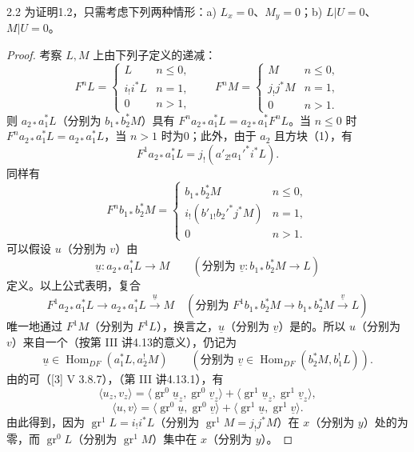\begin{SGAresult}{}{2.2}
为证明1.2，只需考虑下列两种情形：a) $L_x=0$、$M_y=0$；b) $L|U=0$、$M|U=0$。
\end{SGAresult}
\begin{proof}
考察 $L,M$ 上由下列子定义的递减：
\[
 F^nL=\begin{cases}L&n\leq0,\\ i_!i^*L&n=1,\\0&n>1,\end{cases}
 \qquad
 F^nM=\begin{cases}M&n\leq0,\\j_!j^*M&n=1,\\0&n>1.\end{cases}
\]
则 $a_{2*}a_1^*L$（分别为 $b_{1*}b_2^*M$）具有 $F^na_{2*}a_1^*L=a_{2*}a_1^*F^nL$。当 $n\leq0$ 时 $F^na_{2*}a_1^*L=a_{2*}a_1^*L$，当 $n>1$ 时为0；此外，由于 $a_2$ 且方块（1），有
\[
 F^1a_{2*}a_1^*L=j_!(a'_{2!}a_1'^*i^*L).
\]
同样有
\[
 F^nb_{1*}b_2^*M=\begin{cases}
 b_{1*}b_2^*M&n\leq0,\\i_!(b'_{1!}b_2'^*j^*M)&n=1,\\0&n>1.
 \end{cases}
\]
可以假设 $u$（分别为 $v$）由
\[
 \underline u:a_{2*}a_1^*L\longrightarrow M
 \qquad(\text{分别为 }\underline v:b_{1*}b_2^*M\longrightarrow L)
\]
定义。以上公式表明，复合
\[
 F^1a_{2*}a_1^*L\longrightarrow a_{2*}a_1^*L\xrightarrow{\underline u}M
 \quad
 (\text{分别为 }F^1b_{1*}b_2^*M\longrightarrow b_{1*}b_2^*M\xrightarrow{\underline v}L)
\]
唯一地通过 $F^1M$（分别为 $F^1L$），换言之，$\underline u$（分别为 $\underline v$）是的。所以 $u$（分别为 $v$）来自一个（按第 III 讲4.13的意义），仍记为
\[
 \underline u\in\operatorname{Hom}_{DF}(a_1^*L,a_2^!M)
 \qquad(\text{分别为 }\underline v\in\operatorname{Hom}_{DF}(b_2^*M,b_1^!L)).
\]
由的可（[3] V 3.8.7），（第 III 讲4.13.1），有
\[
 \langle u_z,v_z\rangle=
 \langle\operatorname{gr}^0\underline u_z,\operatorname{gr}^0\underline v_z\rangle+
 \langle\operatorname{gr}^1\underline u_z,\operatorname{gr}^1\underline v_z\rangle,
\]
\[
 \langle u,v\rangle=
 \langle\operatorname{gr}^0\underline u,\operatorname{gr}^0\underline v\rangle+
 \langle\operatorname{gr}^1\underline u,\operatorname{gr}^1\underline v\rangle.
\]
由此得到，因为 $\operatorname{gr}^1L=i_!i^*L$（分别为 $\operatorname{gr}^1M=j_!j^*M$）在 $x$（分别为 $y$）处的为零，而 $\operatorname{gr}^0L$（分别为 $\operatorname{gr}^1M$）集中在 $x$（分别为 $y$）。
\end{proof}

